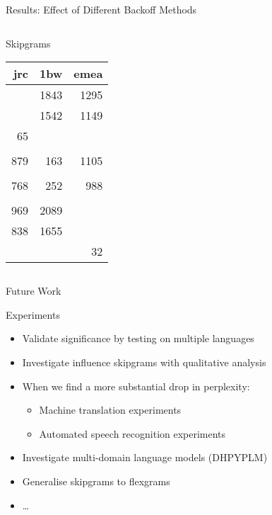 \begin{frame}{Results: Effect of Different Backoff Methods}
{\begin{columns}[T,totalwidth=\textwidth]
\begin{column}{0.5\textwidth}
                \begin{block}{Skipgrams}
                    \begin{tabular}{rrr}
                        jrc & 1bw & emea \\ \hline
                        \cellcolor{green!25}{13} & 1843 & 1295 \\
                        \cellcolor{green!25}{13} & 1542 & 1149 \\
                        65 & \cellcolor{green!25}{1195} & \cellcolor{green!25}{939} \\
                        && \\
                        879 & 163 & 1105 \\
                        \cellcolor{green!25}{751} & \cellcolor{green!25}{162} & \cellcolor{green!25}{921} \\
                        768 & 252 & 988 \\
                        && \\
                        969 & 2089 & \cellcolor{green!25}{4} \\
                        838 & 1655 & \cellcolor{green!25}{4} \\
                        \cellcolor{green!25}{581} & \cellcolor{green!25}{1155} & 32
                    \end{tabular}
                \end{block}
            \end{column}
        \end{columns}
    }
\end{frame}
\note[itemize]{
}

\begin{frame}{Future Work}
    \begin{block}{Experiments}
        \begin{itemize}
            \item Validate significance by testing on multiple languages
            \item Investigate influence skipgrams with qualitative analysis
            \item When we find a more substantial drop in perplexity:
                \begin{itemize}
                    \item Machine translation experiments
                    \item Automated speech recognition experiments
                \end{itemize}
            \item Investigate multi-domain language models (DHPYPLM)
            \item Generalise skipgrams to flexgrams
            \item \ldots
        \end{itemize}
    \end{block}
\end{frame}
\note[itemize]{
}


